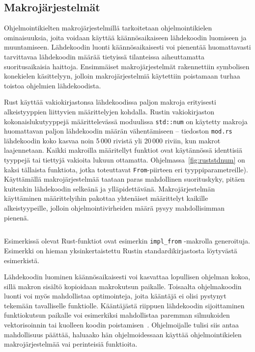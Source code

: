 \subsection{Makrojärjestelmät}


Ohjelmointikielten makrojärjestelmillä tarkoitetaan ohjelmointikielen
ominaisuuksia, joita voidaan käyttää käännösaikaiseen lähdekoodin luomiseen ja
muuntamiseen. Lähdekoodin luonti käännösaikaisesti voi pienentää huomattavasti
tarvittavaa lähdekoodin määrää tietyissä tilanteissa aiheuttamatta
suoritusaikaisia haittoja. Ensimmäiset makrojärjestelmät rakennettiin
symbolisen konekielen käsittelyyn, jolloin makrojärjestelmiä käytettiin
poistamaan turhaa toistoa ohjelmien lähdekoodista.

Rust käyttää vakiokirjastonsa lähdekoodissa paljon makroja erityisesti
alkeistyyppien liittyvien määrittelyjen kohdalla. Rustin vakiokirjaston
kokonaislukutyyppejä määrittelevässä moduulissa \texttt{std::num} on käytetty
makroja huomattavan paljon lähdekoodin määrän vähentämiseen -- tiedoston
\texttt{mod.rs} lähdekoodin koko kasvaa noin 5\,000 rivistä yli 20\,000 riviin,
kun makrot laajennetaan. Kaikki makroilla määritellyt funktiot ovat käytännössä
identtisiä tyyppejä tai tiettyjä vakioita lukuun ottamatta.
Ohjelmassa~\ref{fig:ruststdnum} on kaksi tällaista funktiota, jotka toteuttavat
\texttt{From}-piirteen eri tyyppiparametreille). Käyttämällä makrojärjestelmää
taataan paras mahdollinen suorituskyky, pitäen kuitenkin lähdekoodin selkeänä
ja ylläpidettävänä. Makrojärjestelmän käyttäminen määrittelyihin pakottaa
yhtenäiset määrittelyt kaikille alkeistyypeille, jolloin ohjelmointivirheiden
määrä pysyy mahdollisimman pienenä.

\begin{listing}[ht!]
    \inputminted{Rust}{koodi/ruststdnum.rs}
    \caption{Esimerkissä olevat Rust-funktiot ovat esimerkin
    \texttt{impl\_from} -makrolla generoituja. Esimerkki on hieman
    yksinkertaistettu Rustin standardikirjastosta löytyvästä esimerkistä.}
    \label{fig:ruststdnum}
\end{listing}

Lähdekoodin luominen käännösaikaisesti voi kasvattaa lopullisen ohjelman kokoa,
sillä makron sisältö kopioidaan makrokutsun paikalle. Toisaalta ohjelmakoodin
luonti voi myös mahdollistaa optimointeja, joita kääntäjä ei olisi pystynyt
tekemään tavalliselle funktiolle. Kääntäjästä riippuen lähdekoodin
sijoittaminen funktiokutsun paikalle voi esimerkiksi mahdollistaa paremman
silmukoiden vektorisoinnin tai kuolleen koodin poistamisen~\citep{cinlining}.
Ohjelmoijalle tulisi siis antaa mahdollisuus päättää, haluaako hän
ohjelmoidessaan käyttää ohjelmointikielen makrojärjestelmää vai perinteisiä
funktioita.

